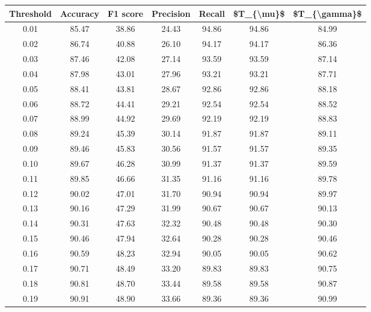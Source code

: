\begin{tabular}{|c|c|c|c|c|c|c|}
\hline
 Threshold &  Accuracy &  F1 score &  Precision &  Recall &  \$T\_\{\textbackslash mu\}\$ &  \$T\_\{\textbackslash gamma\}\$ \\
\hline
      0.01 &     85.47 &     38.86 &      24.43 &   94.86 &      94.86 &         84.99 \\
      0.02 &     86.74 &     40.88 &      26.10 &   94.17 &      94.17 &         86.36 \\
      0.03 &     87.46 &     42.08 &      27.14 &   93.59 &      93.59 &         87.14 \\
      0.04 &     87.98 &     43.01 &      27.96 &   93.21 &      93.21 &         87.71 \\
      0.05 &     88.41 &     43.81 &      28.67 &   92.86 &      92.86 &         88.18 \\
      0.06 &     88.72 &     44.41 &      29.21 &   92.54 &      92.54 &         88.52 \\
      0.07 &     88.99 &     44.92 &      29.69 &   92.19 &      92.19 &         88.83 \\
      0.08 &     89.24 &     45.39 &      30.14 &   91.87 &      91.87 &         89.11 \\
      0.09 &     89.46 &     45.83 &      30.56 &   91.57 &      91.57 &         89.35 \\
      0.10 &     89.67 &     46.28 &      30.99 &   91.37 &      91.37 &         89.59 \\
      0.11 &     89.85 &     46.66 &      31.35 &   91.16 &      91.16 &         89.78 \\
      0.12 &     90.02 &     47.01 &      31.70 &   90.94 &      90.94 &         89.97 \\
      0.13 &     90.16 &     47.29 &      31.99 &   90.67 &      90.67 &         90.13 \\
      0.14 &     90.31 &     47.63 &      32.32 &   90.48 &      90.48 &         90.30 \\
      0.15 &     90.46 &     47.94 &      32.64 &   90.28 &      90.28 &         90.46 \\
      0.16 &     90.59 &     48.23 &      32.94 &   90.05 &      90.05 &         90.62 \\
      0.17 &     90.71 &     48.49 &      33.20 &   89.83 &      89.83 &         90.75 \\
      0.18 &     90.81 &     48.70 &      33.44 &   89.58 &      89.58 &         90.87 \\
      0.19 &     90.91 &     48.90 &      33.66 &   89.36 &      89.36 &         90.99 \\

\end{tabular}
